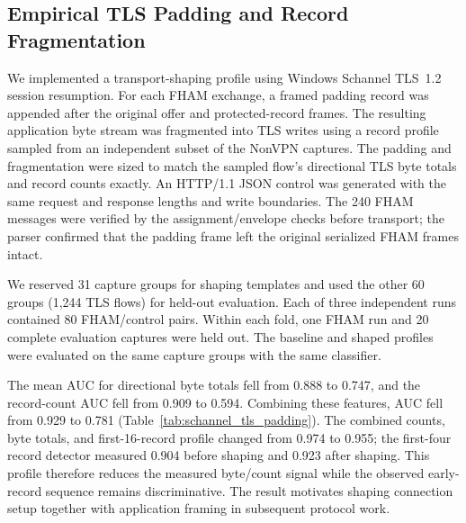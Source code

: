 \documentclass[preprint,12pt]{elsarticle}
\theoremstyle{plain}
\begin{document}
\begin{table}[H]
\centering
\scriptsize
\setlength{\tabcolsep}{3pt}
\caption{Held-out detection of FHAM TLS flows against captured NonVPN TLS traffic.}
\label{tab:nonvpn_tls_detectability}

\end{table}

\subsection{Empirical TLS Padding and Record Fragmentation}

We implemented a transport-shaping profile using Windows Schannel TLS~1.2
session resumption. For each FHAM exchange, a framed padding record was
appended after the original offer and protected-record frames. The resulting
application byte stream was fragmented into TLS writes using a record profile
sampled from an independent subset of the NonVPN captures. The padding and
fragmentation were sized to match the sampled flow's directional TLS byte
totals and record counts exactly. An HTTP/1.1 JSON control was generated with
the same request and response lengths and write boundaries. The 240 FHAM
messages were verified by the assignment/envelope checks before transport;
the parser confirmed that the padding frame left the original serialized FHAM
frames intact.

We reserved 31 capture groups for shaping templates and used the other 60
groups (1,244 TLS flows) for held-out evaluation. Each of three independent
runs contained 80 FHAM/control pairs. Within each fold, one FHAM run and 20
complete evaluation captures were held out. The baseline and shaped profiles
were evaluated on the same capture groups with the same classifier.

The mean AUC for directional byte totals fell from 0.888 to 0.747, and the
record-count AUC fell from 0.909 to 0.594. Combining these features, AUC fell
from 0.929 to 0.781 (Table~\ref{tab:schannel_tls_padding}). The combined
counts, byte totals, and first-16-record profile changed from 0.974 to 0.955; the first-four
record detector measured 0.904 before shaping and 0.923 after shaping. This
profile therefore reduces the measured byte/count signal while the observed
early-record sequence remains discriminative. The result motivates shaping
connection setup together with application framing in subsequent protocol
work.

\begin{table}[H]
\centering
\scriptsize
\setlength{\tabcolsep}{3pt}
\caption{Mean held-out AUC for Schannel TLS~1.2 profiles against the same 60-capture evaluation set.}
\label{tab:schannel_tls_padding}

\end{table}
\end{document}
